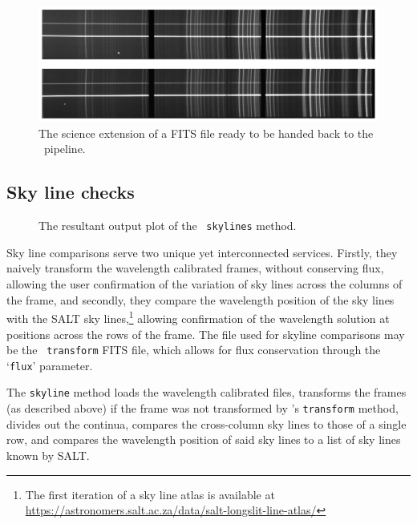 \begin{figure}[t]
    \centering
    \includegraphics[width = 1.0\textwidth]{figures/3_post_wav_cal.pdf}
    \caption{The science extension of a \gls{FITS} file ready to be handed back to the \polsalt\ pipeline.}
    \label{fig:polsalt_post_wav_cal}
\end{figure}

\subsection{Sky line checks}\label{subsec:stops_skyline}

\begin{figure}[t]
    \centering
    \caption{The resultant output plot of the \stops\ \texttt{skylines} method.}
    \label{fig:stops_sky_eg}
\end{figure}


Sky line comparisons serve two unique yet interconnected services. Firstly, they naively transform the wavelength calibrated frames, without conserving flux, allowing the user confirmation of the variation of sky lines across the columns of the frame, and secondly, they compare the wavelength position of the sky lines with the \gls{SALT} sky lines,\footnote{The first iteration of a sky line atlas is available at \url{https://astronomers.salt.ac.za/data/salt-longslit-line-atlas/}} allowing confirmation of the wavelength solution at positions across the rows of the frame. The file used for skyline comparisons may be the \iraf\ \texttt{transform} \gls{FITS} file, which allows for flux conservation through the `\texttt{flux}' parameter.

The \texttt{skyline} method loads the wavelength calibrated files, transforms the frames (as described above) if the frame was not transformed by \iraf's \texttt{transform} method, divides out the continua, compares the cross-column sky lines to those of a single row, and compares the wavelength position of said sky lines to a list of sky lines known by \gls{SALT}.

